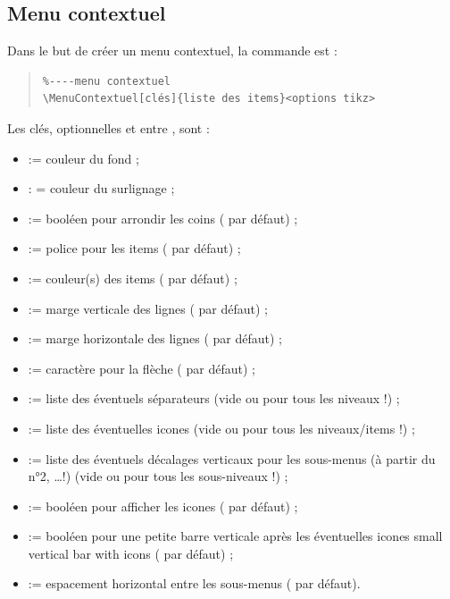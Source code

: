 \documentclass[11pt,a4paper]{ltxdoc}
\begin{document}
\subsection{Menu contextuel}

Dans le but de créer un menu contextuel, la commande est :

\begin{quote}
\begin{verbatim}
%----menu contextuel
\MenuContextuel[clés]{liste des items}<options tikz>
\end{verbatim}
\end{quote}

Les \textsf{clés}, optionnelles et entre \MontreCode{[...]}, sont :

\begin{itemize}
	\item {} := couleur du fond ;
	\item {} : = couleur du surlignage ;
	\item {} := booléen pour arrondir les coins ( par défaut) ;
	\item {} := police pour les items ( par défaut) ;
	\item {} := couleur(s) des items ( par défaut) ;
	\item {} := marge verticale des lignes (\MontreCode{6pt} par défaut) ;
	\item {} := marge horizontale des lignes (\MontreCode{12pt} par défaut) ;
	\item {} := caractère pour la flèche ( par défaut) ;
	\item {} := liste des éventuels séparateurs (vide ou pour tous les niveaux !) ;
	\item {} := liste des éventuelles icones  (vide ou pour tous les niveaux/items !) ;
	\item {} := liste des éventuels décalages verticaux pour les sous-menus (à partir du n°2, \ldots !) (vide ou pour tous les sous-niveaux !) ;
	\item {} := booléen pour afficher les icones ( par défaut) ;
	\item {} := booléen pour une petite barre verticale après les éventuelles icones small vertical bar with icons ( par défaut) ;
	\item {} := espacement horizontal entre les sous-menus ( par défaut).
\end{itemize}
\end{document}

